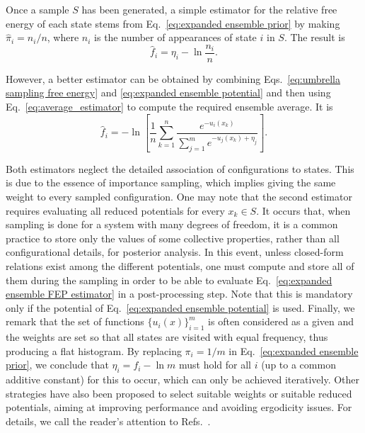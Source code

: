 \documentclass[aip,jcp,preprint,amsmath,amssymb]{revtex4-1}
\begin{document}
Once a sample $S$ has been generated, a simple estimator for the relative free energy of each state stems from Eq.~\eqref{eq:expanded ensemble prior} by making $\hat \pi_i = n_i/n$, where $n_i$ is the number of appearances of state $i$ in $S$. The result is
\begin{equation}
\label{eq:expanded ensemble histogram estimator}
\hat f_i = \eta_i - \ln \frac{n_i}{n}.
\end{equation}

However, a better estimator can be obtained by combining Eqs.~\eqref{eq:umbrella sampling free energy} and \eqref{eq:expanded ensemble potential} and then using Eq.~\eqref{eq:average_estimator} to compute the required ensemble average. It is
\begin{equation}
\label{eq:expanded ensemble FEP estimator}
\hat f_i = -\ln \left[ \frac{1}{n}\sum_{k=1}^n \frac{e^{-u_i(x_k)}}{\sum_{j=1}^m e^{-u_j(x_k) + \eta_j}} \right].
\end{equation}

Both estimators neglect the detailed association of configurations to states. This is due to the essence of importance sampling, which implies giving the same weight to every sampled configuration. One may note that the second estimator requires evaluating all reduced potentials for every $x_k \in S$. It occurs that, when sampling is done for a system with many degrees of freedom, it is a common practice to store only the values of some collective properties, rather than all configurational details, for posterior analysis. In this event, unless closed-form relations exist among the different potentials, one must compute and store all of them during the sampling in order to be able to evaluate Eq.~\eqref{eq:expanded ensemble FEP estimator} in a post-processing step. Note that this is mandatory only if the potential of Eq.~\eqref{eq:expanded ensemble potential} is used. Finally, we remark that the set of functions $\{u_i(x)\}_{i=1}^m$ is often considered as a given and the weights are set so that all states are visited with equal frequency, thus producing a flat histogram. By replacing $\pi_i = 1/m$ in Eq.~\eqref{eq:expanded ensemble prior}, we conclude that $\eta_i = f_i - \ln m$ must hold for all $i$ (up to a common additive constant) for this to occur, which can only be achieved iteratively. Other strategies have also been proposed to select suitable weights or suitable reduced potentials, aiming at improving performance and avoiding ergodicity issues. For details, we call the reader's attention to Refs.~.
\end{document}
